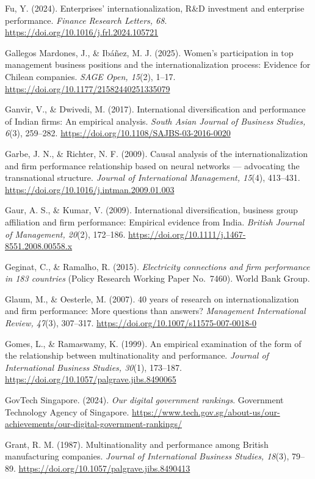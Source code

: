\documentclass[
  a4paper,
  13pt]{extreport}
\begin{document}
Fu, Y. (2024). Enterprises' internationalization, R\&D investment and
enterprise performance. \emph{Finance Research Letters, 68}.
\url{https://doi.org/10.1016/j.frl.2024.105721}

Gallegos Mardones, J., \& Ibáñez, M. J. (2025). Women's participation in
top management business positions and the internationalization process:
Evidence for Chilean companies. \emph{SAGE Open, 15}(2), 1--17.
\url{https://doi.org/10.1177/21582440251335079}

Ganvir, V., \& Dwivedi, M. (2017). International diversification and
performance of Indian firms: An empirical analysis. \emph{South Asian
Journal of Business Studies, 6}(3), 259--282.
\url{https://doi.org/10.1108/SAJBS-03-2016-0020}

Garbe, J. N., \& Richter, N. F. (2009). Causal analysis of the
internationalization and firm performance relationship based on neural
networks --- advocating the transnational structure. \emph{Journal of
International Management, 15}(4), 413--431.
\url{https://doi.org/10.1016/j.intman.2009.01.003}

Gaur, A. S., \& Kumar, V. (2009). International diversification,
business group affiliation and firm performance: Empirical evidence from
India. \emph{British Journal of Management, 20}(2), 172--186.
\url{https://doi.org/10.1111/j.1467-8551.2008.00558.x}

Geginat, C., \& Ramalho, R. (2015). \emph{Electricity connections and
firm performance in 183 countries} (Policy Research Working Paper
No.~7460). World Bank Group.

Glaum, M., \& Oesterle, M. (2007). 40 years of research on
internationalization and firm performance: More questions than answers?
\emph{Management International Review, 47}(3), 307--317.
\url{https://doi.org/10.1007/s11575-007-0018-0}

Gomes, L., \& Ramaswamy, K. (1999). An empirical examination of the form
of the relationship between multinationality and performance.
\emph{Journal of International Business Studies, 30}(1), 173--187.
\url{https://doi.org/10.1057/palgrave.jibs.8490065}

GovTech Singapore. (2024). \emph{Our digital government rankings}.
Government Technology Agency of Singapore.
\url{https://www.tech.gov.sg/about-us/our-achievements/our-digital-government-rankings/}

Grant, R. M. (1987). Multinationality and performance among British
manufacturing companies. \emph{Journal of International Business
Studies, 18}(3), 79--89.
\url{https://doi.org/10.1057/palgrave.jibs.8490413}
\end{document}
